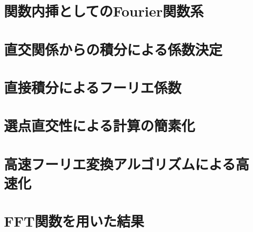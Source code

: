 \section{関数内挿としてのFourier関数系}
 
\section{直交関係からの積分による係数決定}
 
\section{直接積分によるフーリエ係数}
 
\section{選点直交性による計算の簡素化}
 
\section{高速フーリエ変換アルゴリズムによる高速化}
 
\section{FFT関数を用いた結果}
 








